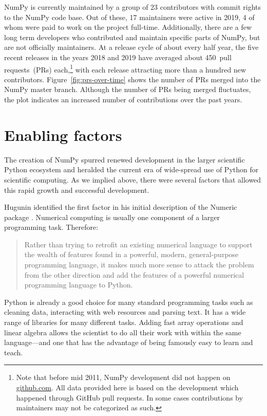 NumPy is currently maintained by a group of 23 contributors with commit rights
to the NumPy code base. Out of these, 17 maintainers were active in
2019, 4 of whom were paid to work on the project full-time.
Additionally, there are a few long term developers who contributed and maintain
specific parts of NumPy, but are not officially maintainers.
At a release cycle of about every half year, the five recent releases in the years
2018 and 2019 have averaged about 450~pull requests~(PRs) each,\footnote{
    Note that before mid 2011, NumPy development did not happen on \url{github.com}.
    All data provided here is based on the development which happened through GitHub
    pull requests. In some cases contributions by maintainers may not be categorized as such.}
with each release attracting more than a hundred new contributors.
Figure~\ref{fig:prs-over-time} shows the number of PRs merged into the NumPy
master branch.
Although the number of PRs being merged fluctuates,
the plot indicates an increased number of contributions over the past
years.

\section*{Enabling factors}

The creation of NumPy spurred renewed development in the larger scientific
Python ecosystem and heralded the current era of wide-spread use of Python for
scientific computing.
As we implied above, there were several factors that allowed this rapid growth
and successful development.

Hugunin identified the first factor in his initial description of the Numeric
package \cite{Hugunin-whitepaper}.  Numerical computing is usually one
component of a larger programming task.  Therefore:

\begin{quote}
    Rather than trying to retrofit an existing numerical language to support
    the wealth of features found in a powerful, modern, general-purpose
    programming language, it makes much more sense to attack the problem from
    the other direction and add the features of a powerful numerical
    programming language to Python.
\end{quote}

Python is already a good choice for many standard programming tasks such as
cleaning data, interacting with web resources and parsing text.  It has a wide
range of libraries for many different tasks. Adding fast array operations and
linear algebra allows the scientist to do all their work with within the same
language---and one that has the advantage of being famously easy to learn and
teach.

